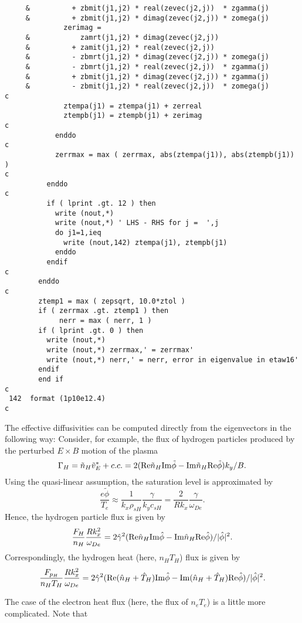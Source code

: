 \begin{verbatim}
     &          + zbmit(j1,j2) * real(zevec(j2,j))  * zgamma(j)
     &          + zbmit(j1,j2) * dimag(zevec(j2,j)) * zomega(j)
              zerimag =
     &            zamrt(j1,j2) * dimag(zevec(j2,j))
     &          + zamit(j1,j2) * real(zevec(j2,j))
     &          - zbmrt(j1,j2) * dimag(zevec(j2,j)) * zomega(j)
     &          - zbmrt(j1,j2) * real(zevec(j2,j))  * zgamma(j)
     &          + zbmit(j1,j2) * dimag(zevec(j2,j)) * zgamma(j)
     &          - zbmit(j1,j2) * real(zevec(j2,j))  * zomega(j)
c
              ztempa(j1) = ztempa(j1) + zerreal
              ztempb(j1) = ztempb(j1) + zerimag
c
            enddo
c
            zerrmax = max ( zerrmax, abs(ztempa(j1)), abs(ztempb(j1)) )
c
          enddo
c
          if ( lprint .gt. 12 ) then
            write (nout,*)
            write (nout,*) ' LHS - RHS for j =  ',j
            do j1=1,ieq
              write (nout,142) ztempa(j1), ztempb(j1)
            enddo
          endif
c
        enddo
c
        ztemp1 = max ( zepsqrt, 10.0*ztol )
        if ( zerrmax .gt. ztemp1 ) then
             nerr = max ( nerr, 1 )
        if ( lprint .gt. 0 ) then
          write (nout,*)
          write (nout,*) zerrmax,' = zerrmax'
          write (nout,*) nerr,' = nerr, error in eigenvalue in etaw16'
        endif
        end if
c
 142  format (1p10e12.4)
c
\end{verbatim}

The effective diffusivities can be computed directly from the 
eigenvectors in the following way:
Consider, for example, the flux of hydrogen particles produced by
the perturbed $ E \times B $ motion of the plasma
\[ \Gamma_H = \tilde{n}_H \tilde{v}_E^* + c.c. 
 = 2 ( {\rm Re} \tilde{n}_H {\rm Im} \tilde{\phi}
     - {\rm Im} \tilde{n}_H {\rm Re} \tilde{\phi} ) k_y / B. \]
Using the quasi-linear assumption, the saturation level is 
approximated by
\[ \frac{e \tilde{\phi}}{T_e}
 \approx \frac{1}{k_x \rho_{sH}} \frac{ \gamma }{ k_y c_{sH} }
 = \frac{2}{R k_x} \frac{\gamma}{\omega_{De}}. \]
Hence, the hydrogen particle flux is given by
\[ \frac{ F_H }{ n_H } \frac{ R k_x^2 }{ \omega_{De} }
  = 2 \hat{\gamma}^2
  ( {\rm Re} \hat{n}_H {\rm Im} \hat{\phi}
  - {\rm Im} \hat{n}_H {\rm Re} \hat{\phi} ) / | \hat{\phi} |^2.
   \]
Correspondingly, the hydrogen heat (here, $ n_H T_H $) flux is given by
\[ \frac{ F_{p_H} }{ n_H T_H } \frac{ R k_x^2 }{ \omega_{De} }
  = 2 \hat{\gamma}^2
  ( {\rm Re} ( \hat{n}_H + \hat{T}_H ) {\rm Im} \hat{\phi}
  - {\rm Im} ( \hat{n}_H + \hat{T}_H ) {\rm Re} \hat{\phi} )
    / | \hat{\phi} |^2.
   \]

The case of the electron heat flux (here, the flux of $ n_e T_e $)
is a little more complicated.  Note that

